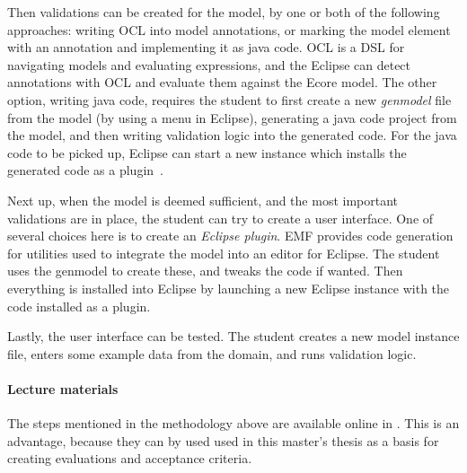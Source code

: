 Then validations can be created for the model, by one or both of the following approaches: writing \acrfull{OCL} into model annotations, or marking the model element with an annotation and implementing it as java code.
\Acrshort{OCL} is a \acrlong{DSL} for navigating models and evaluating expressions, and the \gls{Eclipse} can detect annotations with \acrshort{OCL} and evaluate them against the \gls{Ecore} model.
The other option, writing java code, requires the student to first create a new \textit{genmodel} file from the model (by using a menu in \gls{Eclipse}), generating a java code project from the model, and then writing validation logic into the generated code.
For the java code to be picked up, \gls{Eclipse} can start a new instance which installs the generated code as a plugin~\cite{hallvardtraettebergConstraintsValidationTDT42502020}.


Next up, when the model is deemed sufficient, and the most important validations are in place, the student can try to create a user interface.
One of several choices here is to create an \textit{\gls{Eclipse} plugin}.
\Acrshort{EMF} provides code generation for utilities used to integrate the model into an editor for \gls{Eclipse}.
The student uses the genmodel to create these, and tweaks the code if wanted.
Then everything is installed into \gls{Eclipse} by launching a new \gls{Eclipse} instance with the code installed as a plugin.


Lastly, the user interface can be tested.
The student creates a new model instance file, enters some example data from the domain, and runs validation logic.

\paragraph{Lecture materials}
The steps mentioned in the methodology above are available online in \cite{hallvardtraettebergEMFStepbystepTDT42502017,hallvardtraettebergConstraintsValidationTDT42502020,hallvardtraettebergEditingEcoreModel2017,hallvardtraettebergGenmodelTDT4250NTNU2017}.
This is an advantage, because they can by used used in this master's thesis as a basis for creating evaluations and acceptance criteria.
